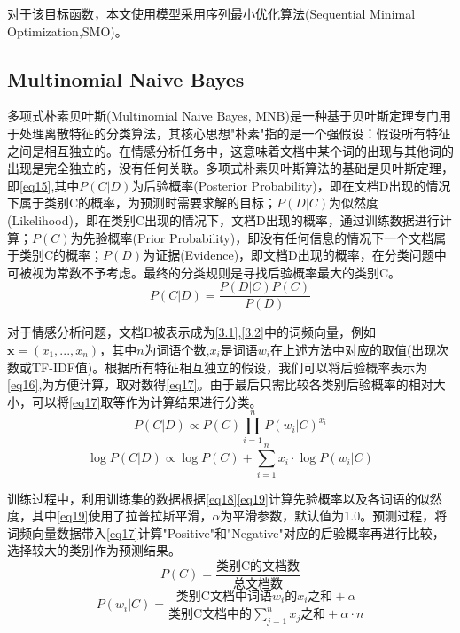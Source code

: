 \documentclass{article}
\begin{document}
对于该目标函数，本文使用模型采用序列最小优化算法(Sequential Minimal Optimization,SMO)。

\subsection{Multinomial Naive Bayes}
多项式朴素贝叶斯(Multinomial Naive Bayes, MNB)是一种基于贝叶斯定理专门用于处理离散特征的分类算法，其核心思想"朴素"指的是一个强假设：假设所有特征之间是相互独立的。在情感分析任务中，这意味着文档中某个词的出现与其他词的出现是完全独立的，没有任何关联。多项式朴素贝叶斯算法的基础是贝叶斯定理，即\eqref{eq15},其中$P(C|D)$为后验概率(Posterior Probability)，即在文档D出现的情况下属于类别C的概率，为预测时需要求解的目标；$P(D|C)$为似然度(Likelihood)，即在类别C出现的情况下，文档D出现的概率，通过训练数据进行计算；$P(C)$为先验概率(Prior Probability)，即没有任何信息的情况下一个文档属于类别C的概率；$P(D)$为证据(Evidence)，即文档D出现的概率，在分类问题中可被视为常数不予考虑。最终的分类规则是寻找后验概率最大的类别C。
\begin{equation}
    P(C|D)=\frac{P(D|C)P(C)}{P(D)} \label{eq15}
\end{equation}

对于情感分析问题，文档D被表示成为\ref{3.1},\ref{3.2}中的词频向量，例如$\boldsymbol{x}=(x_1,...,x_n)$，其中$n$为词语个数,$x_i$是词语$w_i$在上述方法中对应的取值(出现次数或TF-IDF值)。根据所有特征相互独立的假设，我们可以将后验概率表示为\eqref{eq16},为方便计算，取对数得\eqref{eq17}。由于最后只需比较各类别后验概率的相对大小，可以将\eqref{eq17}取等作为计算结果进行分类。
\begin{equation}
    P(C|D)\propto P(C)\prod_{i=1}^{n}P(w_i|C)^{x_i} \label{eq16}
\end{equation}
\begin{equation}
    \log P(C|D)\propto \log P(C) + \sum_{i=1}^{n}x_i·\log P(w_i|C) \label{eq17}
\end{equation}

训练过程中，利用训练集的数据根据\eqref{eq18}\eqref{eq19}计算先验概率以及各词语的似然度，其中\eqref{eq19}使用了拉普拉斯平滑，$\alpha$为平滑参数，默认值为1.0。预测过程，将词频向量数据带入\eqref{eq17}计算"Positive"和"Negative"对应的后验概率再进行比较，选择较大的类别作为预测结果。
\begin{equation}
    P(C)=\frac{\text{类别C的文档数}}{\text{总文档数}} \label{eq18}
\end{equation}
\begin{equation}
    P(w_i|C)=\frac{\text{类别C文档中词语$w_i$的$x_i$之和}+\alpha}{\text{类别C文档中的$\sum_{j=1}^nx_j$之和}+\alpha · n} \label{eq19}
\end{equation}
\end{document}
